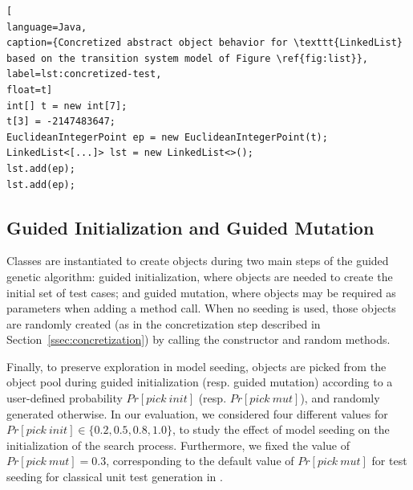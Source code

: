 \begin{lstlisting}[
language=Java,
caption={Concretized abstract object behavior for \texttt{LinkedList} based on the transition system model of Figure \ref{fig:list}},
label=lst:concretized-test,
float=t]
int[] t = new int[7];
t[3] = -2147483647;
EuclideanIntegerPoint ep = new EuclideanIntegerPoint(t);
LinkedList<[...]> lst = new LinkedList<>();
lst.add(ep);
lst.add(ep);
\end{lstlisting}


\subsection{Guided Initialization and Guided Mutation}
\label{ssec:gga}

Classes are instantiated to create objects during two main steps of the guided genetic algorithm: guided initialization, where objects are needed to create the initial set of test cases; and guided mutation, where objects may be required as parameters when adding a method call. When no seeding is used, those objects are randomly created (as in the concretization step described in Section~\ref{ssec:concretization}) by calling the constructor and random methods.

Finally, to preserve exploration in model seeding, objects are picked from the object pool during guided initialization (resp. guided mutation) according to a user-defined probability $Pr[pick\ init]$ (resp. $Pr[pick\ mut]$), and randomly generated otherwise.
In our evaluation, we considered four different values for $Pr[pick\ init] \in \{0.2, 0.5, 0.8, 1.0\}$, to study the effect of model seeding on the initialization of the search process. Furthermore, we fixed the value of $Pr[pick\ mut] = 0.3$, corresponding to the default value of $Pr[pick\ mut]$ for test seeding for classical unit test generation in \evosuite.



